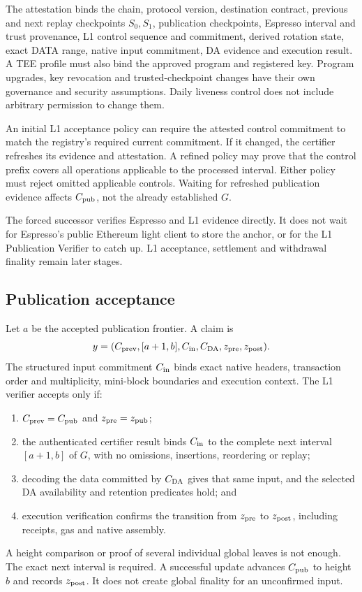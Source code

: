 \documentclass[11pt,a4paper]{article}
\begin{document}
The attestation binds the chain, protocol version, destination contract,
previous and next replay checkpoints $S_0,S_1$, publication checkpoints,
Espresso interval and trust provenance,
L1 control sequence and commitment, derived rotation state, exact DATA
range, native input commitment, DA evidence and execution result. A TEE
profile must also bind the approved program and registered key. Program
upgrades, key revocation and trusted-checkpoint changes have their own
governance and security assumptions. Daily liveness control does not
include arbitrary permission to change them.

An initial L1 acceptance policy can require the attested control
commitment to match the registry's required current commitment.
If it changed, the certifier refreshes its evidence and attestation.
A refined policy may prove that the control prefix covers all operations
applicable to the processed interval. Either policy must reject omitted
applicable controls. Waiting for refreshed publication evidence affects
$C_{\rm pub}$, not the already established $G$.

The forced successor verifies Espresso and L1 evidence directly.
It does not wait for Espresso's public Ethereum light client to store
the anchor, or for the L1 Publication Verifier to catch up. L1 acceptance,
settlement and withdrawal finality remain later stages.

\subsection{Publication acceptance}
Let $a$ be the accepted publication frontier. A claim is
\[
 y=(C_{\rm prev},[a+1,b],C_{\rm in},C_{\rm DA},z_{\rm pre},z_{\rm post}).
\]
The structured input commitment $C_{\rm in}$ binds exact native headers,
transaction order and multiplicity, mini-block boundaries and execution
context. The L1 verifier accepts only if:
\begin{enumerate}
\item $C_{\rm prev}=C_{\rm pub}$ and $z_{\rm pre}=z_{\rm pub}$;
\item the authenticated certifier result binds $C_{\rm in}$ to the
complete next interval $[a+1,b]$ of $G$, with no omissions, insertions,
reordering or replay;
\item decoding the data committed by $C_{\rm DA}$ gives that same input,
and the selected DA availability and retention predicates hold; and
\item execution verification confirms the transition from $z_{\rm pre}$
to $z_{\rm post}$, including receipts, gas and native assembly.
\end{enumerate}
A height comparison or proof of several individual global leaves is
not enough. The exact next interval is required. A successful update
advances $C_{\rm pub}$ to height $b$ and records $z_{\rm post}$.
It does not create global finality for an unconfirmed input.
\end{document}
